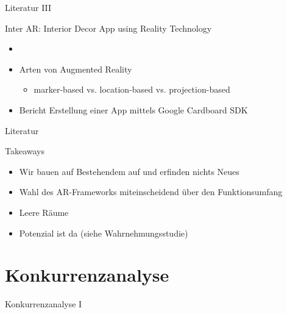 \documentclass[presentation,bigger,aspectratio=169]{beamer}
\begin{document}
\begin{frame}[label={sec:org423d5b8}]{Literatur III}
\begin{block}{Inter AR: Interior Decor App using Reality Technology}
\begin{itemize}
\item \textcite{moaresInterARInterior2020}
\item Arten von Augmented Reality
\begin{itemize}
\item marker-based vs. location-based vs. projection-based
\end{itemize}
\item Bericht Erstellung einer App mittels Google Cardboard SDK
\end{itemize}
\end{block}
\end{frame}

\begin{frame}[label={sec:org82fd5a5}]{Literatur}
\begin{block}{Takeaways}
\begin{itemize}
\item Wir bauen auf Bestehendem auf und erfinden nichts Neues
\item Wahl des AR-Frameworks miteinscheidend über den Funktionsumfang
\item Leere Räume
\item Potenzial ist da (siehe Wahrnehmungsstudie)
\end{itemize}
\end{block}
\end{frame}

\section{Konkurrenzanalyse}
\label{sec:org04d380d}
\begin{frame}[label={sec:org04e11ff}]{\vspace{2.2cm}\begin{center}\MakeUppercase{\insertsection}\end{center}}
\end{frame}

\begin{frame}[label={sec:org436bc67}]{Konkurrenzanalyse I}
\end{frame}
\end{document}
